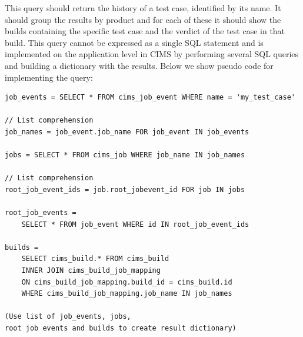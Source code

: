 \label{q:tchistory}
This query should return the history of a test case, identified by its name. It should group the results by product and for each of these it should show the builds containing the specific test case and the verdict of the test case in that build. This query cannot be expressed as a single SQL statement and is implemented on the application level in CIMS by performing several SQL queries and building a dictionary with the results. Below we show pseudo code for implementing the query:
\begin{verbatim}
job_events = SELECT * FROM cims_job_event WHERE name = 'my_test_case'

// List comprehension
job_names = job_event.job_name FOR job_event IN job_events 

jobs = SELECT * FROM cims_job WHERE job_name IN job_names

// List comprehension
root_job_event_ids = job.root_jobevent_id FOR job IN jobs

root_job_events = 
    SELECT * FROM job_event WHERE id IN root_job_event_ids

builds = 
    SELECT cims_build.* FROM cims_build
    INNER JOIN cims_build_job_mapping
    ON cims_build_job_mapping.build_id = cims_build.id
    WHERE cims_build_job_mapping.job_name IN job_names

(Use list of job_events, jobs, 
root job events and builds to create result dictionary)

\end{verbatim}



